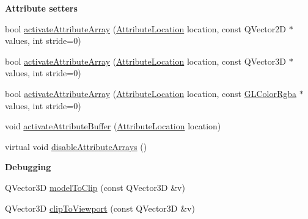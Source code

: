 \begin{Indent}\textbf{ Attribute setters}\par
\begin{DoxyCompactItemize}
\item 
bool \mbox{\hyperlink{class_g_l_e_s_renderer_a8529c317862c57c027acce876bad17bb}{activate\+Attribute\+Array}} (\mbox{\hyperlink{class_g_l_e_s_renderer_a05f4cf233d5cf60f4d6ea50ddc06a2c4}{Attribute\+Location}} location, const Q\+Vector2D $\ast$values, int stride=0)
\item 
bool \mbox{\hyperlink{class_g_l_e_s_renderer_a102377bf45b15bb52324214d2e9b6f14}{activate\+Attribute\+Array}} (\mbox{\hyperlink{class_g_l_e_s_renderer_a05f4cf233d5cf60f4d6ea50ddc06a2c4}{Attribute\+Location}} location, const Q\+Vector3D $\ast$values, int stride=0)
\item 
bool \mbox{\hyperlink{class_g_l_e_s_renderer_ada229880a48efdbb3daaa375b701ace0}{activate\+Attribute\+Array}} (\mbox{\hyperlink{class_g_l_e_s_renderer_a05f4cf233d5cf60f4d6ea50ddc06a2c4}{Attribute\+Location}} location, const \mbox{\hyperlink{class_g_l_color_rgba}{G\+L\+Color\+Rgba}} $\ast$values, int stride=0)
\item 
void \mbox{\hyperlink{class_g_l_e_s_renderer_ad0bc53b13af77050b43f7a6ba5f97ea1}{activate\+Attribute\+Buffer}} (\mbox{\hyperlink{class_g_l_e_s_renderer_a05f4cf233d5cf60f4d6ea50ddc06a2c4}{Attribute\+Location}} location)
\item 
virtual void \mbox{\hyperlink{class_g_l_e_s_renderer_a0978cd1fe3baab589b7bfbcde6554c15}{disable\+Attribute\+Arrays}} ()
\end{DoxyCompactItemize}
\end{Indent}
\begin{Indent}\textbf{ Debugging}\par
\begin{DoxyCompactItemize}
\item 
Q\+Vector3D \mbox{\hyperlink{class_g_l_e_s_renderer_a5d591173ee2492417476253eb2e41986}{model\+To\+Clip}} (const Q\+Vector3D \&v)
\item 
Q\+Vector3D \mbox{\hyperlink{class_g_l_e_s_renderer_a531ca73b72e3a00a667b9f8237735724}{clip\+To\+Viewport}} (const Q\+Vector3D \&v)
\end{DoxyCompactItemize}
\end{Indent}
